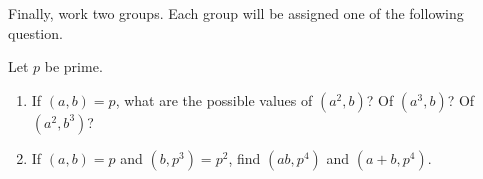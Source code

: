 \documentclass{ximera}
\begin{document}
Finally, work two groups. Each group will be assigned one of the following question.


\begin{br}
	Let $p$ be prime.
	\begin{enumerate}
		\item If $(a,b)=p$, what are the possible values of $(a^2,b)$? Of $(a^3,b)$? Of $(a^2,b^3)$?
		
			
		\item If $(a,b)=p$ and $(b,p^3)=p^2$, find $(ab,p^4)$ and $(a+b,p^4)$.
		
	\end{enumerate}
\end{br}

\end{document}
